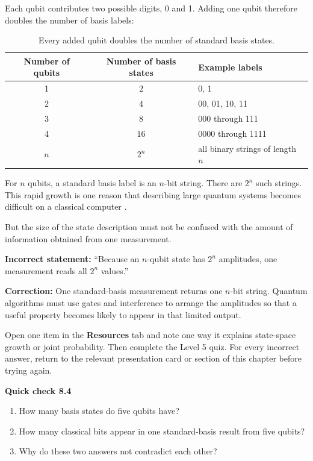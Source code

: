 Each qubit contributes two possible digits, 0 and 1. Adding one qubit therefore doubles the number of basis labels:
\begin{table}[H]
\centering
\begin{tabular}{ccl}
\toprule
Number of qubits & Number of basis states & Example labels \\
\midrule
1 & $2$ & 0, 1 \\
2 & $4$ & 00, 01, 10, 11 \\
3 & $8$ & 000 through 111 \\
4 & $16$ & 0000 through 1111 \\
$n$ & $2^n$ & all binary strings of length $n$ \\
\bottomrule
\end{tabular}
\caption{Every added qubit doubles the number of standard basis states.}
\label{tab:ch08-state-space-growth}
\end{table}

For $n$ qubits, a standard basis label is an $n$-bit string. There are $2^n$ such strings. This rapid growth is one reason that describing large quantum systems becomes difficult on a classical computer \citep{preskill1998lectureNotes,nielsenChuang2010}.

But the size of the state description must not be confused with the amount of information obtained from one measurement.

\begin{misconception}
\textbf{Incorrect statement:} ``Because an $n$-qubit state has $2^n$ amplitudes, one measurement reads all $2^n$ values.''

\medskip
\textbf{Correction:} One standard-basis measurement returns one $n$-bit string. Quantum algorithms must use gates and interference to arrange the amplitudes so that a useful property becomes likely to appear in that limited output.
\end{misconception}

\begin{appactivity}
Open one item in the \textbf{Resources} tab and note one way it explains state-space growth or joint probability. Then complete the Level 5 quiz. For every incorrect answer, return to the relevant presentation card or section of this chapter before trying again.
\end{appactivity}

\begin{checkpoint}
\textbf{Quick check 8.4}
\begin{enumerate}
  \item How many basis states do five qubits have?
  \item How many classical bits appear in one standard-basis result from five qubits?
  \item Why do these two answers not contradict each other?
\end{enumerate}
\end{checkpoint}

